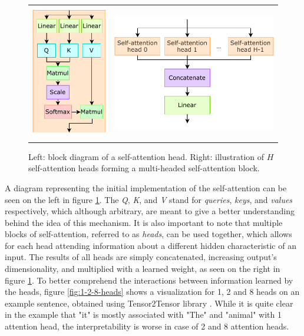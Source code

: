 \begin{figure}[!hpt]
  \centering
  \begin{tabular}{cc}
      {\includegraphics[width=0.2\columnwidth]{background/self_attention.pdf}} &
      {\includegraphics[width=0.4\columnwidth]{background/multi_head_self_attention.pdf}}
  \end{tabular}
  \caption{Left: block diagram of a self-attention head. Right: illustration of \(H\) self-attention heads forming a multi-headed self-attention block.}
  \label{fig:self-attention-multi-head}
\end{figure}

A diagram representing the initial implementation of the self-attention can be seen on the left in figure \ref{fig:self-attention-multi-head}. The \textit{Q}, \textit{K}, and \textit{V} stand for \textit{queries}, \textit{keys}, and \textit{values} respectively, which although arbitrary, are meant to give a better understanding behind the idea of this mechanism. It is also important to note that multiple blocks of self-attention, referred to as \textit{heads}, can be used together, which allows for each head attending information about a different hidden characteristic of an input. The results of all heads are simply concatenated, increasing output's dimensionality, and multiplied with a learned weight, as seen on the right in figure \ref{fig:self-attention-multi-head}. To better comprehend the interactions between information learned by the heads, figure \ref{fig:1-2-8-heads} shows a visualization for 1, 2 and 8 heads on an example sentence, obtained using Tensor2Tensor library \cite{tensor2tensor,73-alammarillustrated}. While it is quite clear in the example that "it" is mostly associated with "The" and "animal" with 1 attention head, the interpretability is worse in case of 2 and 8 attention heads.

